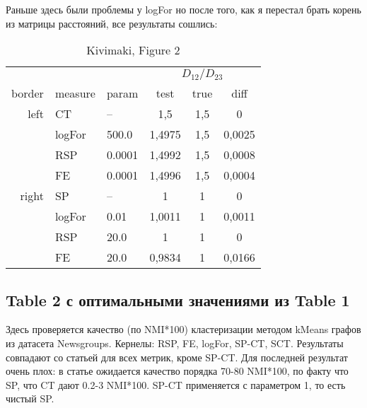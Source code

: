 \documentclass{article}
\begin{document}
Раньше здесь были проблемы у logFor но после того, как я перестал брать корень из матрицы расстояний, все результаты сошлись:

\begin{table}[H]
\centering
\caption{Kivimaki, Figure 2}
\label{my-label}
\begin{tabular}{rll|cc|c}
       &         &        & \multicolumn{3}{c}{$D_{12} / D_{23}$} \\
border & measure & param  & test   & true & diff   \\
       \hline
left   & CT      & --       & 1,5    & 1,5  & 0      \\
       & logFor  & 500.0  & 1,4975 & 1,5  & 0,0025 \\
       & RSP     & 0.0001 & 1,4992 & 1,5  & 0,0008 \\
       & FE      & 0.0001 & 1,4996 & 1,5  & 0,0004 \\
       \hline
right  & SP      & --       & 1      & 1    & 0      \\
       & logFor  & 0.01   & 1,0011 & 1    & 0,0011 \\
       & RSP     & 20.0   & 1      & 1    & 0      \\
       & FE      & 20.0   & 0,9834 & 1    & 0,0166
\end{tabular}
\end{table}

\subsection{Table 2 с оптимальными значениями из Table 1}
Здесь проверяется качество (по NMI*100) кластеризации методом kMeans графов из датасета Newsgroups. Кернелы: RSP, FE, logFor, SP-CT, SCT. Результаты совпадают со статьей для всех метрик, кроме SP-CT. Для последней результат очень плох: в статье ожидается качество порядка 70-80 NMI*100, по факту что SP, что CT дают 0.2-3 NMI*100. SP-CT применяется с параметром 1, то есть чистый SP.
\end{document}
